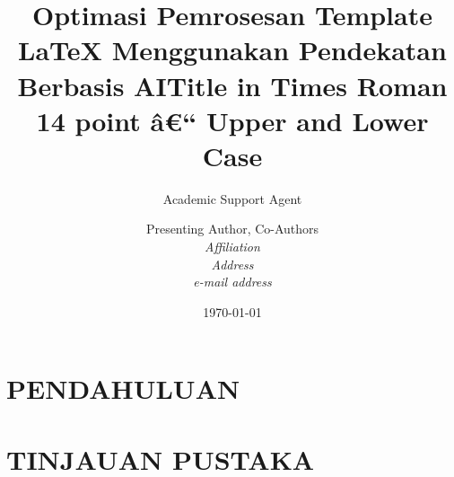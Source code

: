 \documentclass{article}
\title{Optimasi Pemrosesan Template LaTeX Menggunakan Pendekatan Berbasis AI}
\author{Academic Support Agent}
\date{\today}
\begin{document}
\maketitle

\begin{abstract}

\end{abstract}

\chapter{PENDAHULUAN}


\chapter{TINJAUAN PUSTAKA}


\usepackage[utf8]{inputenc}
\usepackage{geometry}
\usepackage{times} %
\usepackage{titling}

\geometry{
  a4paper,
  top=30mm,
  bottom=30mm,
  left=30mm,
  right=30mm
}

\pretitle{\begin{center}\large\bfseries}
\posttitle{\par\end{center}\vskip 0.5em}
\preauthor{\begin{center}\small}
\postauthor{\par\end{center}}
\predate{\par\begin{center}\small}
\postdate{\par\end{center}}

\title{Title in Times Roman 14 point â€“ Upper and Lower Case}
\author{Presenting Author, Co-Authors\\
\textit{Affiliation}\\
\textit{Address}\\
\textit{e-mail address}}
\date{} %
\end{document}
